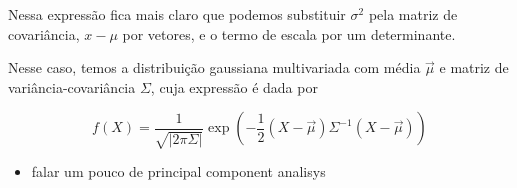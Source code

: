 \documentclass[
  ignorenonframetext,
  aspectratio=169,
]{beamer}
\providecommand{\tightlist}{%
  \setlength{\itemsep}{0pt}\setlength{\parskip}{0pt}}
\begin{document}
\begin{frame}
Nessa expressão fica mais claro que podemos substituir \(\sigma^2\) pela
matriz de covariância, \(x-\mu\) por vetores, e o termo de escala por um
determinante.

Nesse caso, temos a distribuição gaussiana multivariada com média
\(\vec \mu\) e matriz de variância-covariância \(\Sigma\), cuja
expressão é dada por

\[f(X) = \frac{1}{\sqrt{|2\pi\Sigma|}}\exp\left(-\frac{1}{2}\left(X-\vec\mu\right)\Sigma^{-1}(X-\vec\mu)\right) \]

\begin{itemize}
\tightlist
\item
  falar um pouco de principal component analisys
\end{itemize}
\end{frame} 
 
\end{document}
